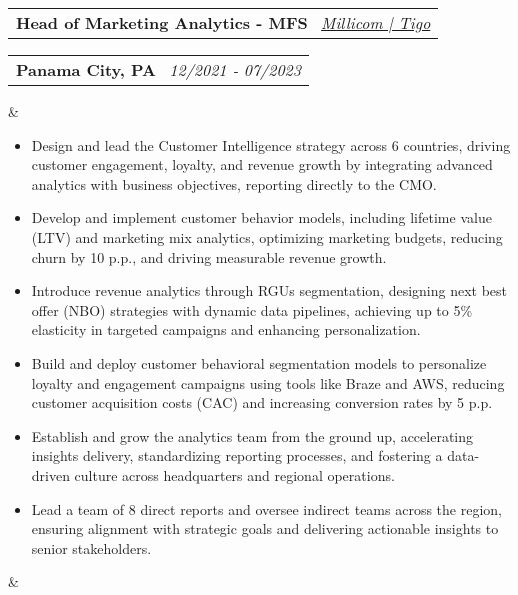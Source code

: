 \documentclass[11pt,a4paper,sans]{moderncv}
\makeatletter
\newcommand*{\customcventry}[7][.13em]{
\begin{tabular}{@{}l}
{\bfseries #4} \
{\itshape #3}
\end{tabular}
\hfill
\begin{tabular}{l@{}}
{\bfseries #5} \
{\itshape #2}
\end{tabular}
\ifx&#7&%
\else{\ %
\begin{minipage}{\maincolumnwidth}%
\small#7%
\end{minipage}}\fi%
\par\addvspace{#1}}
\makeatother
\begin{document}
\customcventry{12/2021 ‐ 07/2023}{\color{blue}\href{https://www.millicom.com/}{Millicom | Tigo}}{Head of Marketing Analytics - MFS}{Panama City, PA}{}{{
\begin{itemize}[leftmargin=0.6cm, label={\textbullet}, itemsep=-0.2em]
\item Design and lead the Customer Intelligence strategy across 6 countries, driving customer engagement, loyalty, and revenue growth by integrating advanced analytics with business objectives, reporting directly to the CMO.
\item Develop and implement customer behavior models, including lifetime value (LTV) and marketing mix analytics, optimizing marketing budgets, reducing churn by 10 p.p., and driving measurable revenue growth.
\item Introduce revenue analytics through RGUs segmentation, designing next best offer (NBO) strategies with dynamic data pipelines, achieving up to 5\% elasticity in targeted campaigns and enhancing personalization.
\item Build and deploy customer behavioral segmentation models to personalize loyalty and engagement campaigns using tools like Braze and AWS, reducing customer acquisition costs (CAC) and increasing conversion rates by 5 p.p.
\item Establish and grow the analytics team from the ground up, accelerating insights delivery, standardizing reporting processes, and fostering a data-driven culture across headquarters and regional operations.
\item Lead a team of 8 direct reports and oversee indirect teams across the region, ensuring alignment with strategic goals and delivering actionable insights to senior stakeholders.
\end{itemize}
\vspace{-0.1em}
}}
\end{document}
